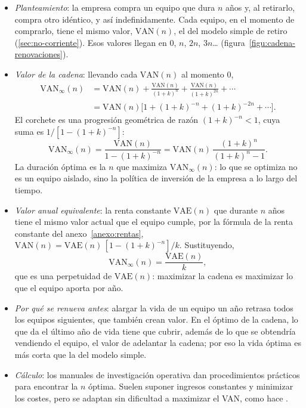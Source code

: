 \documentclass[11pt]{article}
\begin{document}
\begin{itemize}
\item \emph{Planteamiento}: la empresa compra un equipo que dura $n$ años y, al retirarlo, compra otro idéntico, y así indefinidamente. Cada equipo, en el momento de comprarlo, tiene el mismo valor, $\mathrm{VAN}(n)$, el del modelo simple de retiro (\ref{sec:no-corriente}). Esos valores llegan en $0$, $n$, $2n$, $3n$… (figura~\ref{figu:cadena-renovaciones}).
\end{itemize}

\begin{infografia}[H]
\centering
\caption{La cadena de renovaciones con equipos idénticos}\label{figu:cadena-renovaciones}
\end{infografia}

\begin{itemize}
\item \emph{Valor de la cadena}: llevando cada $\mathrm{VAN}(n)$ al momento 0,
  \begin{align*}
  \mathrm{VAN}_\infty(n)&=\mathrm{VAN}(n)+\frac{\mathrm{VAN}(n)}{(1+k)^{n}}+\frac{\mathrm{VAN}(n)}{(1+k)^{2n}}+\cdots\\
  &=\mathrm{VAN}(n)\big[1+(1+k)^{-n}+(1+k)^{-2n}+\cdots\big].
  \end{align*}
  El corchete es una progresión geométrica de razón $(1+k)^{-n}<1$, cuya suma es $1/[1-(1+k)^{-n}]$:
  \[
  \mathrm{VAN}_\infty(n)=\frac{\mathrm{VAN}(n)}{1-(1+k)^{-n}}=\mathrm{VAN}(n)\,\frac{(1+k)^n}{(1+k)^n-1}.
  \]
  La duración óptima es la $n$ que maximiza $\mathrm{VAN}_\infty(n)$: lo que se optimiza no es un equipo aislado, sino la política de inversión de la empresa a lo largo del tiempo.\findemo
\item \emph{Valor anual equivalente}: la renta constante $\mathrm{VAE}(n)$ que durante $n$ años tiene el mismo valor actual que el equipo cumple, por la fórmula de la renta constante del anexo~\ref{anexo:rentas}, $\mathrm{VAN}(n)=\mathrm{VAE}(n)\,[1-(1+k)^{-n}]/k$. Sustituyendo,
  \[
  \mathrm{VAN}_\infty(n)=\frac{\mathrm{VAE}(n)}{k},
  \]
  que es una perpetuidad de $\mathrm{VAE}(n)$: maximizar la cadena es maximizar lo que el equipo aporta por año.\findemo
\item \emph{Por qué se renueva antes}: alargar la vida de un equipo un año retrasa todos los equipos siguientes, que también crean valor. En el óptimo de la cadena, lo que da el último año de vida tiene que cubrir, además de lo que se obtendría vendiendo el equipo, el valor de adelantar la cadena; por eso la vida óptima es más corta que la del modelo simple.
\item \emph{Cálculo}: los manuales de investigación operativa dan procedimientos prácticos para encontrar la $n$ óptima\nocite{ChurchmanAckoffArnoff1957Introduction}. Suelen suponer ingresos constantes y minimizar los costes, pero se adaptan sin dificultad a maximizar el VAN, como hace \textcite{Mao1969Quantitative}.
\end{itemize}
\end{document}
